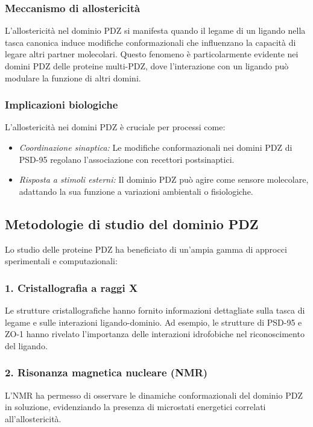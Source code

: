 \documentclass[Lau,binding=0.6cm,oneside,noexaminfo]{sapthesis}
\begin{document}
\subsubsection*{Meccanismo di allostericità}
L’allostericità nel dominio PDZ si manifesta quando il legame di un ligando nella tasca canonica induce modifiche conformazionali che influenzano la capacità di legare altri partner molecolari. Questo fenomeno è particolarmente evidente nei domini PDZ delle proteine multi-PDZ, dove l’interazione con un ligando può modulare la funzione di altri domini.

\subsubsection*{Implicazioni biologiche}
L’allostericità nei domini PDZ è cruciale per processi come:
\begin{itemize}
    \item \emph{Coordinazione sinaptica:} Le modifiche conformazionali nei domini PDZ di PSD-95 regolano l’associazione con recettori postsinaptici.
    \item \emph{Risposta a stimoli esterni:} Il dominio PDZ può agire come sensore molecolare, adattando la sua funzione a variazioni ambientali o fisiologiche.
\end{itemize}

\subsection*{Metodologie di studio del dominio PDZ}

Lo studio delle proteine PDZ ha beneficiato di un’ampia gamma di approcci sperimentali e computazionali:

\subsubsection*{1. Cristallografia a raggi X}
Le strutture cristallografiche hanno fornito informazioni dettagliate sulla tasca di legame e sulle interazioni ligando-dominio. Ad esempio, le strutture di PSD-95 e ZO-1 hanno rivelato l’importanza delle interazioni idrofobiche nel riconoscimento del ligando.

\subsubsection*{2. Risonanza magnetica nucleare (NMR)}
L’NMR ha permesso di osservare le dinamiche conformazionali del dominio PDZ in soluzione, evidenziando la presenza di microstati energetici correlati all’allostericità.
\end{document}
